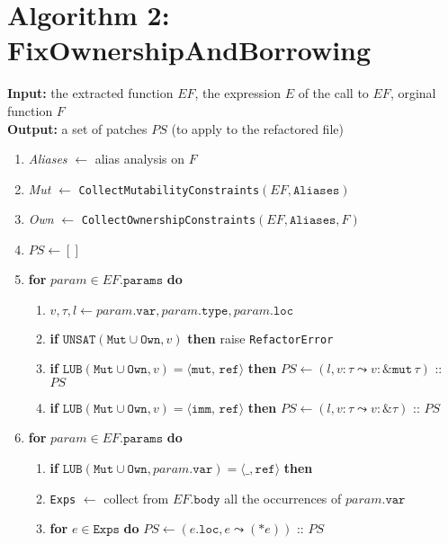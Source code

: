 \documentclass{article}
\begin{document}
\newpage

\section{Algorithm 2: FixOwnershipAndBorrowing}
\textbf{Input:} the extracted function $EF$, the expression $E$ of the call to
$EF$, orginal function $F$ \\
\textbf{Output:} a set of patches $PS$ (to apply to the refactored file)

\begin{enumerate}
    \item \textit{Aliases} $\leftarrow$ alias analysis on $F$
    \item \textit{Mut} $\leftarrow$ \texttt{CollectMutabilityConstraints}$(EF, \texttt{Aliases})$
    \item \textit{Own} $\leftarrow$ \texttt{CollectOwnershipConstraints}$(EF, \texttt{Aliases}, F)$
    \item $PS \leftarrow []$

    \item \textbf{for} $param \in EF.\texttt{params}$ \textbf{do}
    \begin{enumerate}
        \item $v, \tau, l \leftarrow param.\texttt{var}, param.\texttt{type}, param.\texttt{loc}$
        \item \textbf{if} $\texttt{UNSAT}(\texttt{Mut} \cup \texttt{Own}, v)$ \textbf{then} raise \texttt{RefactorError}
        \item \textbf{if} $\texttt{LUB}(\texttt{Mut} \cup \texttt{Own}, v) = \langle \texttt{mut, ref} \rangle$ \textbf{then} $PS \leftarrow (l, v\!:\!\tau \leadsto v\!:\!\&\texttt{mut} \, \tau)$ :: $PS$
        \item \textbf{if} $\texttt{LUB}(\texttt{Mut} \cup \texttt{Own}, v) = \langle \texttt{imm, ref} \rangle$ \textbf{then} $PS \leftarrow (l, v\!:\!\tau \leadsto v\!:\!\&\tau)$ :: $PS$
    \end{enumerate}

    \item \textbf{for} $param \in EF.\texttt{params}$ \textbf{do}
    \begin{enumerate}
        \item \textbf{if} $\texttt{LUB}(\texttt{Mut} \cup \texttt{Own}, param.\texttt{var}) = \langle \_, \texttt{ref} \rangle$ \textbf{then}
        \item \quad \texttt{Exps} $\leftarrow$ collect from $EF.\texttt{body}$ all the occurrences of $param.\texttt{var}$
        \item \quad \textbf{for} $e \in \texttt{Exps}$ \textbf{do} $PS \leftarrow (e.\texttt{loc}, e \leadsto (*e))$ :: $PS$
    \end{enumerate}


\end{enumerate}
\end{document}
